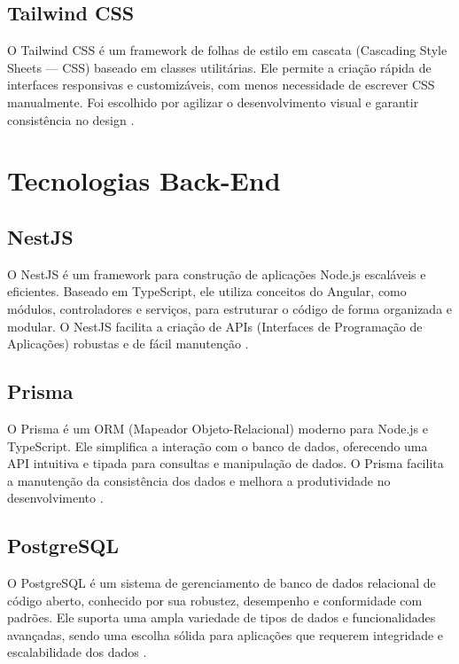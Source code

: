 \subsection{Tailwind CSS}

O Tailwind CSS é um framework de folhas de estilo em cascata (Cascading Style Sheets — CSS) baseado em classes utilitárias. Ele permite a criação rápida de interfaces responsivas e customizáveis, com menos necessidade de escrever CSS manualmente. Foi escolhido por agilizar o desenvolvimento visual e garantir consistência no design \cite{tailwindcss}.

\section{Tecnologias Back-End}

\subsection{NestJS}

O NestJS é um framework para construção de aplicações Node.js escaláveis e eficientes. Baseado em TypeScript, ele utiliza conceitos do Angular, como módulos, controladores e serviços, para estruturar o código de forma organizada e modular. O NestJS facilita a criação de APIs (Interfaces de Programação de Aplicações) robustas e de fácil manutenção \cite{nestjs}.

\subsection{Prisma}

O Prisma é um ORM (Mapeador Objeto-Relacional) moderno para Node.js e TypeScript. Ele simplifica a interação com o banco de dados, oferecendo uma API intuitiva e tipada para consultas e manipulação de dados. O Prisma facilita a manutenção da consistência dos dados e melhora a produtividade no desenvolvimento \cite{prisma}.

\subsection{PostgreSQL}

O PostgreSQL é um sistema de gerenciamento de banco de dados relacional de código aberto, conhecido por sua robustez, desempenho e conformidade com padrões. Ele suporta uma ampla variedade de tipos de dados e funcionalidades avançadas, sendo uma escolha sólida para aplicações que requerem integridade e escalabilidade dos dados \cite{postgresql}.

